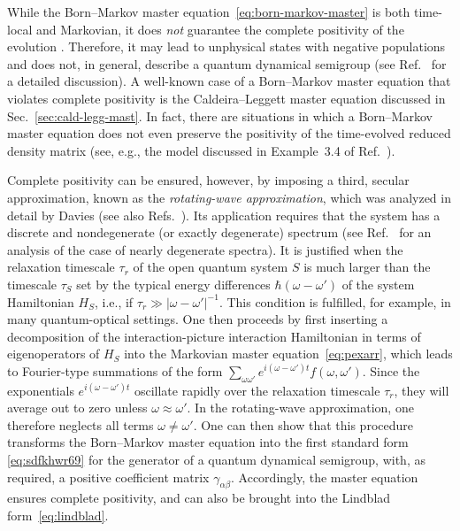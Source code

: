 \documentclass[3p,sort&compress,12pt]{elsarticle}
\providecommand{\abs}[1]{\left\lvert#1\right\rvert}
\newcommand{\E}{\ensuremath{e}}
\newcommand{\I}{\ensuremath{i}}
\newcommand{\op}[1]{#1}
\begin{document}
While the Born--Markov master equation~\eqref{eq:born-markov-master} is both time-local and Markovian, it does \emph{not} guarantee the complete positivity of the evolution \cite{Alicki:2007:uu,Benatti:2005:ii}. Therefore, it may lead to unphysical states with negative populations and does not, in general, describe a quantum dynamical semigroup (see Ref.~\cite{Benatti:2005:ii} for a detailed discussion). A well-known case of a Born--Markov master equation that violates complete positivity is the Caldeira--Leggett master equation \cite{Caldeira:1983:on} discussed in Sec.~\ref{sec:cald-legg-mast}. In fact, there are situations in which a Born--Markov master equation does not even preserve the positivity of the time-evolved reduced density matrix \cite{Dumke:1979:ia,Benatti:2005:ii} (see, e.g., the model discussed in Example~3.4 of Ref.~\cite{Benatti:2005:ii}).

Complete positivity can be ensured, however, by imposing a third, secular approximation, known as the \emph{rotating-wave approximation}, which was analyzed in detail by Davies \cite{Davies:1974:tw,Davies:1976:oo,Davies:1976:uu,Davies:1978:uu} (see also Refs.~\cite{Dumke:1979:ia,Breuer:2002:oq,Alicki:2007:uu,Hornberger:2009:aq}). Its application requires that the system has a discrete and nondegenerate (or exactly degenerate) spectrum (see Ref.~\cite{Davies:1978:uu} for an analysis of the case of nearly degenerate spectra). It is justified when the relaxation timescale $\tau_r$ of the open quantum system $S$ is much larger than the timescale $\tau_S$ set by the typical energy differences $\hbar(\omega-\omega')$ of the system Hamiltonian $\op{H}_S$, i.e., if $\tau_r \gg \abs{\omega-\omega'}^{-1}$. This condition is fulfilled, for example, in many quantum-optical settings. One then proceeds by first inserting a decomposition of the interaction-picture interaction Hamiltonian in terms of eigenoperators of $\op{H}_S$ into the Markovian master equation~\eqref{eq:pexarr}, which leads to Fourier-type summations of the form $\sum_{\omega \omega'} \E^{\I (\omega-\omega')t} f(\omega, \omega')$. Since the exponentials $\E^{\I (\omega-\omega')t}$ oscillate rapidly over the relaxation timescale $\tau_r$, they will average out to zero unless $\omega \approx \omega'$. In the rotating-wave approximation, one therefore neglects all terms $\omega \not= \omega'$.  One can then show \cite{Davies:1974:tw,Davies:1976:oo,Davies:1976:uu,Breuer:2002:oq,Alicki:2007:uu,Hornberger:2009:aq} that this procedure transforms the Born--Markov master equation into the first standard form \eqref{eq:sdfkhwr69} for the generator of a quantum dynamical semigroup, with, as required, a positive coefficient matrix $\gamma_{\alpha\beta}$. Accordingly, the master equation ensures complete positivity, and can also be brought into the Lindblad form~\eqref{eq:lindblad}.
\end{document}
